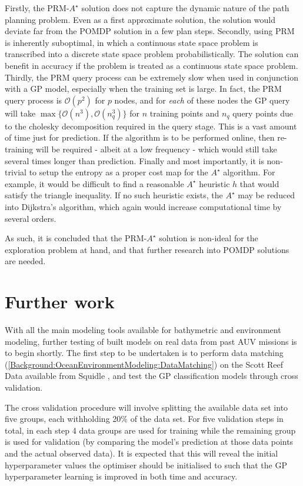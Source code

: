 			Firstly, the PRM-$A^{\star}$ solution does not capture the dynamic nature of the path planning problem. Even as a first approximate solution, the solution would deviate far from the POMDP solution in a few plan steps. Secondly, using PRM is inherently suboptimal, in which a continuous state space problem is transcribed into a discrete state space problem probabilistically. The solution can benefit in accuracy if the problem is treated as a continuous state space problem. Thirdly, the PRM query process can be extremely slow when used in conjunction with a GP model, especially when the training set is large. In fact, the PRM query process is $\mathcal{O}(p^{2})$ for $p$ nodes, and for \textit{each} of these nodes the GP query will take $\max\{\mathcal{O}(n^{3}), \mathcal{O}(n_{q}^{3})\}$ for $n$ training points and $n_{q}$ query points due to the cholesky decomposition required in the query stage. This is a vast amount of time just for prediction. If the algorithm is to be performed online, then re-training will be required - albeit at a low frequency - which would still take several times longer than prediction. Finally and most importantly, it is non-trivial to setup the entropy as a proper cost map for the $A^{\star}$ algorithm. For example, it would be difficult to find a reasonable $A^{\star}$ heuristic $h$ that would satisfy the triangle inequality. If no such heuristic exists, the $A^{\star}$ may be reduced into Dijkstra's algorithm, which again would increase computational time by several orders.
		
			As such, it is concluded that the PRM-$A^{\star}$ solution is non-ideal for the exploration problem at hand, and that further research into POMDP solutions are needed.
			
			\FloatBarrier
			
	\section{Further work}
	\label{ProgressReport:FurtherWork}
	
		With all the main modeling tools available for bathymetric and environment modeling, further testing of built models on real data from past AUV missions is to begin shortly. The first step to be undertaken is to perform data matching (\cref{Background:OceanEnvironmentModeling:DataMatching}) on the Scott Reef Data available from Squidle \cite{Squidle}, and test the GP classification models through cross validation.
		
		The cross validation procedure will involve splitting the available data set into five groups, each withholding 20\% of the data set. For five validation steps in total, in each step 4 data groups are used for training while the remaining group is used for validation (by comparing the model's prediction at those data points and the actual observed data). It is expected that this will reveal the initial hyperparameter values the optimiser should be initialised to such that the GP hyperparameter learning is improved in both time and accuracy.
		
